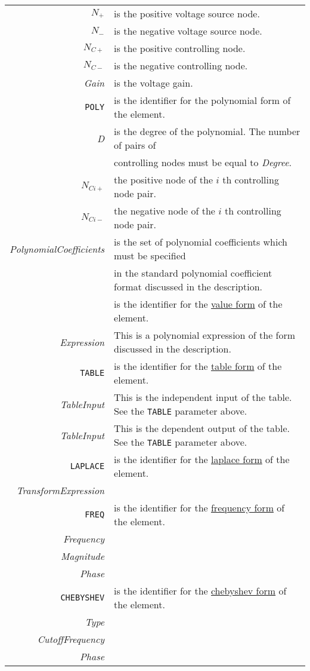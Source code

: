 \begin{tabular}{r l}
$N_{+}$ & is the positive voltage source node.\\
$N_{-}$ & is the negative voltage source node.\\
$N_{C+}$ & is the positive controlling node.\\
$N_{C-}$ & is the negative controlling  node.\\
{\it Gain} & is the voltage gain.\\
{\tt POLY} & is the identifier for the polynomial form of the
element.\\
{\it D} & is the degree of the polynomial. The number of pairs
of\\
 & controlling nodes must be equal to {\it Degree}.\\
$N_{Ci+}$ & the positive node of the $i$ th controlling node
pair.\\
$N_{Ci-}$ & the negative node of the $i$ th controlling node
pair.\\
{\it PolynomialCoefficients} & is the set of polynomial
coefficients which must be specified\\
& in the standard polynomial coefficient format discussed in the description.\\
\notforsspice{ {\tt VALUE} & is the identifier for the
\underline{value form} of the element.\\
{\it Expression} & This is a polynomial expression of the form
discussed in the description.\\
{\tt TABLE} & is the identifier for the \underline{table form} of
the element.\\
{\it TableInput} & This is the independent input of the table. See
the {\tt TABLE} parameter above.\\
{\it TableInput} & This is the dependent output of the table. See
the {\tt TABLE} parameter above.\\
{\tt LAPLACE} & is the identifier for the \underline{laplace form}
of the element.\\
{\it TransformExpression} & \\
{\tt FREQ} & is the identifier for the \underline{frequency form} of the element.\\
{\it Frequency} & \\
{\it Magnitude} & \\
{\it Phase} & \\
{\tt CHEBYSHEV} & is the identifier for the \underline{chebyshev
form} of the element.\\
{\it Type} & \\
{\it CutoffFrequency} & \\
{\it Phase}} & \\
\end{tabular}
